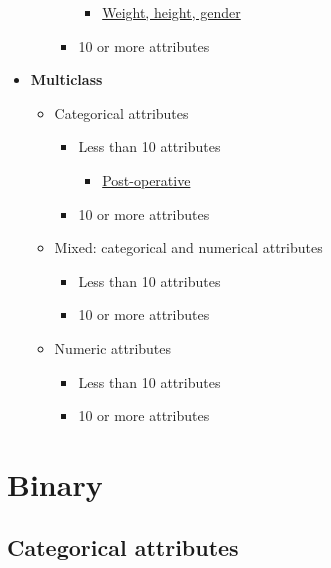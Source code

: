\documentclass[]{article}
\providecommand{\tightlist}{%
  \setlength{\itemsep}{0pt}\setlength{\parskip}{0pt}}
\begin{document}
\begin{itemize}
\begin{itemize}
\begin{itemize}
      \begin{itemize}
      \tightlist
      \item
        \protect\hyperlink{Weight-height-gender}{Weight, height, gender}
      \end{itemize}
    \item
      10 or more attributes
    \end{itemize}
  \end{itemize}
\item
  \textbf{Multiclass}

  \begin{itemize}
  \tightlist
  \item
    Categorical attributes

    \begin{itemize}
    \tightlist
    \item
      Less than 10 attributes

      \begin{itemize}
      \tightlist
      \item
        \protect\hyperlink{Post-operative}{Post-operative}
      \end{itemize}
    \item
      10 or more attributes
    \end{itemize}
  \item
    Mixed: categorical and numerical attributes

    \begin{itemize}
    \tightlist
    \item
      Less than 10 attributes
    \item
      10 or more attributes
    \end{itemize}
  \item
    Numeric attributes

    \begin{itemize}
    \tightlist
    \item
      Less than 10 attributes
    \item
      10 or more attributes
    \end{itemize}
  \end{itemize}
\end{itemize}

\hypertarget{binary-1}{%
\section{Binary}\label{binary-1}}

\hypertarget{categorical-attributes}{%
\subsection{Categorical attributes}\label{categorical-attributes}}
\end{document}
